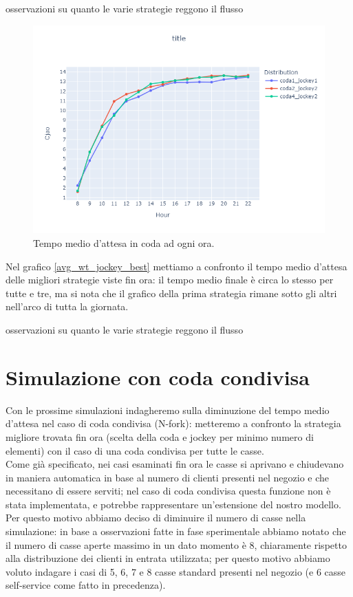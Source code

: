 osservazioni su quanto le varie strategie reggono il flusso

\begin{figure}[htp!]
	\centering
	\includegraphics[width=12cm]{"images/results/avg_wt_jockey_best.png"}
	\caption{Tempo medio d'attesa in coda ad ogni ora.}
	\label{fig:avg_wt_jockey_best}
\end{figure}

Nel grafico \ref{avg_wt_jockey_best} mettiamo a confronto il tempo medio d'attesa delle migliori strategie viste fin ora: il tempo medio finale è circa lo stesso per tutte e tre, ma si nota che il grafico della prima strategia rimane sotto gli altri nell'arco di tutta la giornata.


osservazioni su quanto le varie strategie reggono il flusso

\section{Simulazione con coda condivisa}

Con le prossime simulazioni indagheremo sulla diminuzione del tempo medio d'attesa nel caso di coda condivisa (N-fork): metteremo a confronto la strategia migliore trovata fin ora (scelta della coda e jockey per minimo numero di elementi) con il caso di una coda condivisa per tutte le casse. \\
Come già specificato, nei casi esaminati fin ora le casse si aprivano e chiudevano in maniera automatica in base al numero di clienti presenti nel negozio e che necessitano di essere serviti; nel caso di coda condivisa questa funzione non è stata implementata, e potrebbe rappresentare un'estensione del nostro modello. Per questo motivo abbiamo deciso di diminuire il numero di casse nella simulazione: in base a osservazioni fatte in fase sperimentale abbiamo notato che il numero di casse aperte massimo in un dato momento è 8, chiaramente rispetto alla distribuzione dei clienti in entrata utilizzata; per questo motivo abbiamo voluto indagare i casi di 5, 6, 7 e 8 casse standard presenti nel negozio (e 6 casse self-service come fatto in precedenza).

